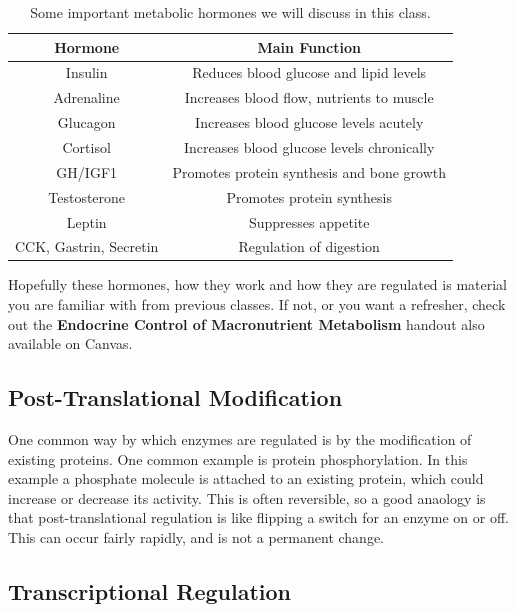 \documentclass{tufte-handout}
\begin{document}
\begin{table}[h]
\centering
\caption{Some important metabolic hormones we will discuss in this class.}
\label{tab:hormones}
\begin{tabular}{cc}
\hline
\textbf{Hormone}       & \textbf{Main Function}                     \\
\hline
Insulin                & Reduces blood glucose and lipid levels     \\
Adrenaline        & Increases blood flow, nutrients to muscle \\
Glucagon               & Increases blood glucose levels acutely     \\
Cortisol               & Increases blood glucose levels chronically \\
GH/IGF1                & Promotes protein synthesis and bone growth \\
Testosterone           & Promotes protein synthesis                 \\
Leptin                 & Suppresses appetite                        \\
CCK, Gastrin, Secretin & Regulation of digestion                   \\
\hline
\end{tabular}
\end{table}


Hopefully these hormones, how they work and how they are regulated is material you are familiar with from previous classes.  If not, or you want a refresher, check out the \textbf{Endocrine Control of Macronutrient Metabolism} handout also available on Canvas.  

\subsection{Post-Translational Modification}

One common way by which enzymes are regulated is by the modification of existing proteins.  One common example is protein phosphorylation.  In this example a phosphate molecule is attached to an existing protein, which could increase or decrease its activity.  This is often reversible, so a good anaology is that post-translational regulation is like flipping a switch for an enzyme on or off.  This can occur fairly rapidly, and is not a permanent change.

\subsection{Transcriptional Regulation}
\end{document}
